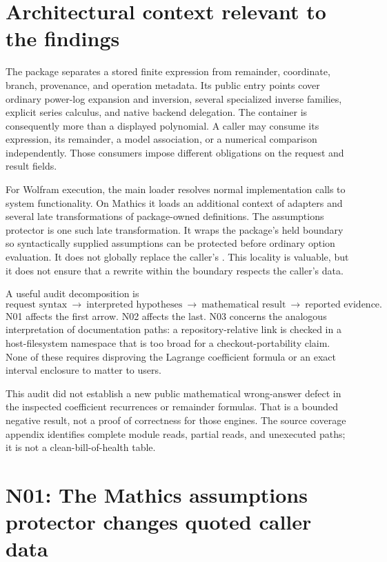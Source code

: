 \documentclass[11pt,letterpaper]{article}
\newcommand{\code}[1]{\texttt{\detokenize{#1}}}
\begin{document}
\section{Architectural context relevant to the findings}

The package separates a stored finite expression from remainder, coordinate,
branch, provenance, and operation metadata. Its public entry points cover
ordinary power-log expansion and inversion, several specialized inverse
families, explicit series calculus, and native backend delegation. The
\code{GeneralizedSeries} container is consequently more than a displayed
polynomial. A caller may consume its expression, its remainder, a model
association, or a numerical comparison independently. Those consumers impose
different obligations on the request and result fields.\cite{main,series,guide}

For Wolfram execution, the main loader resolves normal implementation calls to
system functionality. On Mathics it loads an additional context of adapters
and several late transformations of package-owned definitions. The assumptions
protector is one such late transformation. It wraps the package's held
\code{catch} boundary so syntactically supplied assumptions can be protected
before ordinary option evaluation. It does not globally replace the caller's
\code{System`Element}. This locality is valuable, but it does not ensure that a
rewrite within the boundary respects the caller's data.\cite{main,protect}

A useful audit decomposition is
\[
 \text{request syntax}\ \longrightarrow\ \text{interpreted hypotheses}
 \ \longrightarrow\ \text{mathematical result}
 \ \longrightarrow\ \text{reported evidence}.
\]
N01 affects the first arrow. N02 affects the last. N03 concerns the analogous
interpretation of documentation paths: a repository-relative link is checked
in a host-filesystem namespace that is too broad for a checkout-portability
claim. None of these requires disproving the Lagrange coefficient formula or
an exact interval enclosure to matter to users.

This audit did not establish a new public mathematical wrong-answer defect in
the inspected coefficient recurrences or remainder formulas. That is a bounded
negative result, not a proof of correctness for those engines. The source
coverage appendix identifies complete module reads, partial reads, and
unexecuted paths; it is not a clean-bill-of-health table.

\section{N01: The Mathics assumptions protector changes quoted caller data}
\label{sec:n01}
\end{document}
